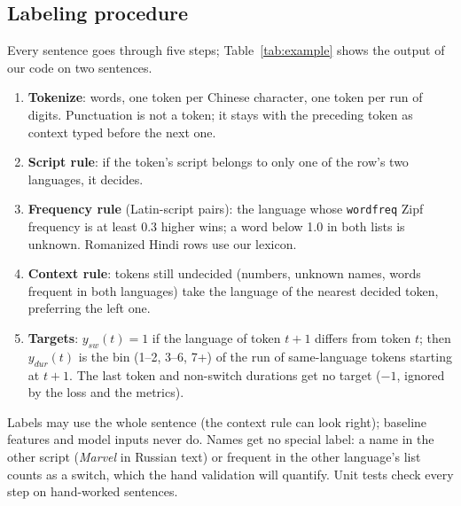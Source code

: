 \documentclass[sigconf,nonacm]{acmart}
\begin{document}
\subsection{Labeling procedure}
\label{sec:labeling}
Every sentence goes through five steps; Table~\ref{tab:example} shows the output of our code on two sentences.
\begin{enumerate}
\item \textbf{Tokenize}: words, one token per Chinese character, one token per run of digits. Punctuation is
not a token; it stays with the preceding token as context typed before the next one.
\item \textbf{Script rule}: if the token's script belongs to only one of the row's two languages, it decides.
\item \textbf{Frequency rule} (Latin-script pairs): the language whose \texttt{wordfreq} Zipf frequency is at
least 0.3 higher wins; a word below 1.0 in both lists is unknown. Romanized Hindi rows use our lexicon.
\item \textbf{Context rule}: tokens still undecided (numbers, unknown names, words frequent in both languages)
take the language of the nearest decided token, preferring the left one.
\item \textbf{Targets}: $y_{sw}(t)=1$ if the language of token $t+1$ differs from token $t$; then $y_{dur}(t)$
is the bin (1--2, 3--6, 7+) of the run of same-language tokens starting at $t+1$. The last token and
non-switch durations get no target ($-1$, ignored by the loss and the metrics).
\end{enumerate}
Labels may use the whole sentence (the context rule can look right); baseline features and model inputs never
do. Names get no special label: a name in the other script (\emph{Marvel} in Russian text) or frequent in the
other language's list counts as a switch, which the hand validation will quantify. Unit tests check every step
on hand-worked sentences.
\end{document}
